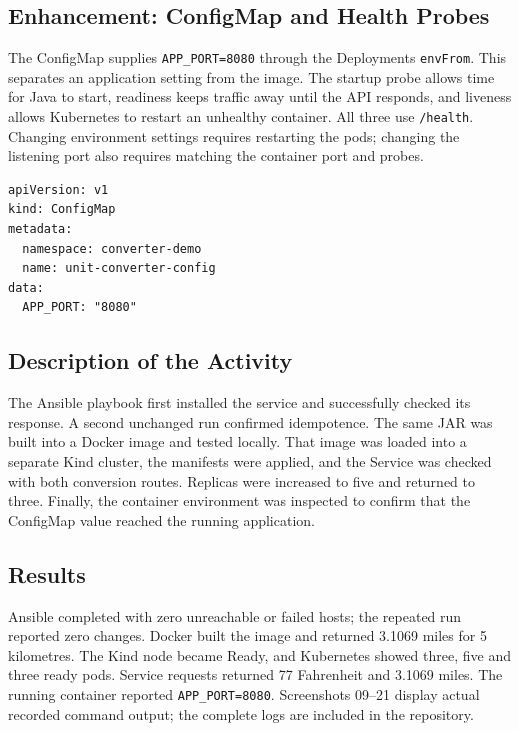 \documentclass[12pt,a4paper]{article}
\begin{document}
\subsection*{Enhancement: ConfigMap and Health Probes}

The ConfigMap supplies \texttt{APP\_PORT=8080} through the Deployment\textquotesingle s \texttt{envFrom}. This separates an application setting from the image. The startup probe allows time for Java to start, readiness keeps traffic away until the API responds, and liveness allows Kubernetes to restart an unhealthy container. All three use \texttt{/health}. Changing environment settings requires restarting the pods; changing the listening port also requires matching the container port and probes.

\par\medskip{}\noindent\textbf{}\par\smallskip

\begin{lstlisting}
apiVersion: v1
kind: ConfigMap
metadata:
  namespace: converter-demo
  name: unit-converter-config
data:
  APP_PORT: "8080"
\end{lstlisting}

\subsection*{Description of the Activity}

The Ansible playbook first installed the service and successfully checked its response. A second unchanged run confirmed idempotence. The same JAR was built into a Docker image and tested locally. That image was loaded into a separate Kind cluster, the manifests were applied, and the Service was checked with both conversion routes. Replicas were increased to five and returned to three. Finally, the container environment was inspected to confirm that the ConfigMap value reached the running application.

\subsection*{Results}

Ansible completed with zero unreachable or failed hosts; the repeated run reported zero changes. Docker built the image and returned 3.1069 miles for 5 kilometres. The Kind node became Ready, and Kubernetes showed three, five and three ready pods. Service requests returned 77 Fahrenheit and 3.1069 miles. The running container reported \texttt{APP\_PORT=8080}. Screenshots 09--21 display actual recorded command output; the complete logs are included in the repository.
\end{document}
